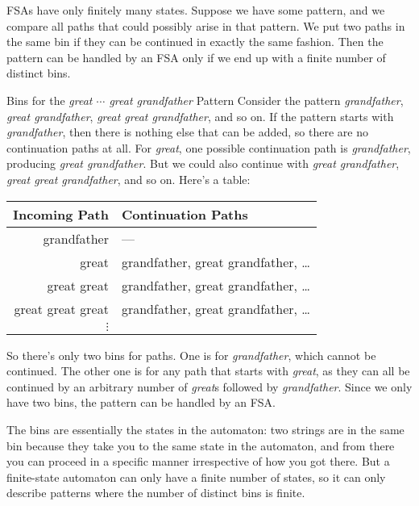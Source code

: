 FSAs have only finitely many states.
Suppose we have some pattern, and we compare all paths that could possibly arise in that pattern.
We put two paths in the same bin if they can be continued in exactly the same fashion.
Then the pattern can be handled by an FSA only if we end up with a finite number of distinct bins.
%
\begin{examplebox}{Bins for the \emph{great $\cdots$ great grandfather} Pattern}
    Consider the pattern \emph{grandfather}, \emph{great grandfather}, \emph{great great grandfather}, and so on.
    If the pattern starts with \emph{grandfather}, then there is nothing else that can be added, so there are no continuation paths at all.
    For \emph{great}, one possible continuation path is \emph{grandfather}, producing \emph{great grandfather}.
    But we could also continue with \emph{great grandfather}, \emph{great great grandfather}, and so on.
    Here's a table:
    \begin{center}
        \begin{tabular}{rl}
            \toprule
            \textbf{Incoming Path} & \textbf{Continuation Paths}\\
            \midrule
            grandfather & ---\\
            great & grandfather, great grandfather, \ldots\\
            great great & grandfather, great grandfather, \ldots\\
            great great great & grandfather, great grandfather, \ldots\\
            $\vdots$
            \\
            \bottomrule
        \end{tabular}
    \end{center}
    So there's only two bins for paths.
    One is for \emph{grandfather}, which cannot be continued.
    The other one is for any path that starts with \emph{great}, as they can all be continued by an arbitrary number of \emph{great}s followed by \emph{grandfather}.
    Since we only have two bins, the pattern can be handled by an FSA\@.
\end{examplebox}

The bins are essentially the states in the automaton: two strings are in the same bin because they take you to the same state in the automaton, and from there you can proceed in a specific manner irrespective of how you got there.
But a finite-state automaton can only have a finite number of states, so it can only describe patterns where the number of distinct bins is finite.

